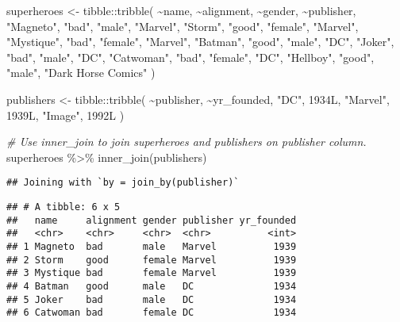 \documentclass[
]{article}
\newenvironment{Shaded}{\begin{snugshade}}{\end{snugshade}}
\newcommand{\CommentTok}[1]{\textcolor[rgb]{0.56,0.35,0.01}{\textit{#1}}}
\newcommand{\FunctionTok}[1]{\textcolor[rgb]{0.00,0.00,0.00}{#1}}
\newcommand{\NormalTok}[1]{#1}
\newcommand{\OtherTok}[1]{\textcolor[rgb]{0.56,0.35,0.01}{#1}}
\newcommand{\SpecialCharTok}[1]{\textcolor[rgb]{0.00,0.00,0.00}{#1}}
\newcommand{\StringTok}[1]{\textcolor[rgb]{0.31,0.60,0.02}{#1}}
\begin{document}
\begin{Shaded}
\begin{Highlighting}[]
\NormalTok{superheroes }\OtherTok{\textless{}{-}}\NormalTok{ tibble}\SpecialCharTok{::}\FunctionTok{tribble}\NormalTok{(}
       \SpecialCharTok{\textasciitilde{}}\NormalTok{name, }\SpecialCharTok{\textasciitilde{}}\NormalTok{alignment,  }\SpecialCharTok{\textasciitilde{}}\NormalTok{gender,          }\SpecialCharTok{\textasciitilde{}}\NormalTok{publisher,}
   \StringTok{"Magneto"}\NormalTok{,      }\StringTok{"bad"}\NormalTok{,   }\StringTok{"male"}\NormalTok{,            }\StringTok{"Marvel"}\NormalTok{,}
     \StringTok{"Storm"}\NormalTok{,     }\StringTok{"good"}\NormalTok{, }\StringTok{"female"}\NormalTok{,            }\StringTok{"Marvel"}\NormalTok{,}
  \StringTok{"Mystique"}\NormalTok{,      }\StringTok{"bad"}\NormalTok{, }\StringTok{"female"}\NormalTok{,            }\StringTok{"Marvel"}\NormalTok{,}
    \StringTok{"Batman"}\NormalTok{,     }\StringTok{"good"}\NormalTok{,   }\StringTok{"male"}\NormalTok{,                }\StringTok{"DC"}\NormalTok{,}
     \StringTok{"Joker"}\NormalTok{,      }\StringTok{"bad"}\NormalTok{,   }\StringTok{"male"}\NormalTok{,                }\StringTok{"DC"}\NormalTok{,}
  \StringTok{"Catwoman"}\NormalTok{,      }\StringTok{"bad"}\NormalTok{, }\StringTok{"female"}\NormalTok{,                }\StringTok{"DC"}\NormalTok{,}
   \StringTok{"Hellboy"}\NormalTok{,     }\StringTok{"good"}\NormalTok{,   }\StringTok{"male"}\NormalTok{, }\StringTok{"Dark Horse Comics"}
\NormalTok{  )}

\NormalTok{publishers }\OtherTok{\textless{}{-}}\NormalTok{ tibble}\SpecialCharTok{::}\FunctionTok{tribble}\NormalTok{(}
  \SpecialCharTok{\textasciitilde{}}\NormalTok{publisher, }\SpecialCharTok{\textasciitilde{}}\NormalTok{yr\_founded,}
        \StringTok{"DC"}\NormalTok{,       1934L,}
    \StringTok{"Marvel"}\NormalTok{,       1939L,}
     \StringTok{"Image"}\NormalTok{,       1992L}
\NormalTok{  )}

\CommentTok{\# Use inner\_join to join superheroes and publishers on publisher column.}
\NormalTok{superheroes }\SpecialCharTok{\%\textgreater{}\%}
\FunctionTok{inner\_join}\NormalTok{(publishers)}
\end{Highlighting}
\end{Shaded}

\begin{verbatim}
## Joining with `by = join_by(publisher)`
\end{verbatim}

\begin{verbatim}
## # A tibble: 6 x 5
##   name     alignment gender publisher yr_founded
##   <chr>    <chr>     <chr>  <chr>          <int>
## 1 Magneto  bad       male   Marvel          1939
## 2 Storm    good      female Marvel          1939
## 3 Mystique bad       female Marvel          1939
## 4 Batman   good      male   DC              1934
## 5 Joker    bad       male   DC              1934
## 6 Catwoman bad       female DC              1934
\end{verbatim}
\end{document}
